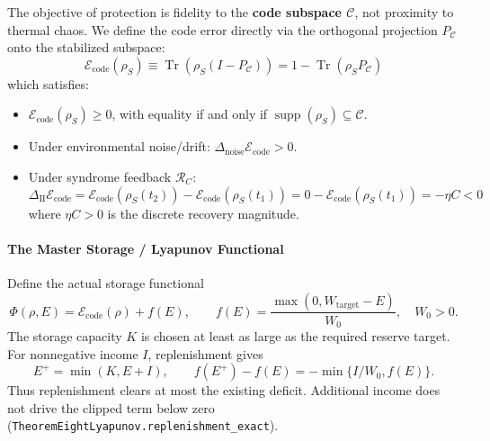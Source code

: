 \documentclass[
]{article}
\providecommand{\tightlist}{%
  \setlength{\itemsep}{0pt}\setlength{\parskip}{0pt}}
\begin{document}
The objective of protection is fidelity to the \textbf{code subspace
\(\mathcal{C}\)}, not proximity to thermal chaos. We define the code
error directly via the orthogonal projection \(P_{\mathcal{C}}\) onto
the stabilized subspace:
\[\mathcal{E}_{\mathrm{code}}(\rho_S) \equiv \operatorname{Tr}\left(\rho_S (I - P_{\mathcal{C}})\right) = 1 - \operatorname{Tr}(\rho_S P_{\mathcal{C}})\]
which satisfies:

\begin{itemize}
\tightlist
\item
  \(\mathcal{E}_{\mathrm{code}}(\rho_S) \ge 0\), with equality if and
  only if \(\operatorname{supp}(\rho_S) \subseteq \mathcal{C}\).
\item
  Under environmental noise/drift:
  \(\Delta_{\mathrm{noise}} \mathcal{E}_{\mathrm{code}} > 0\).
\item
  Under syndrome feedback \(\mathcal{R}_C\):
  \[\Delta_{\mathrm{II}} \mathcal{E}_{\mathrm{code}} = \mathcal{E}_{\mathrm{code}}(\rho_S(t_2)) - \mathcal{E}_{\mathrm{code}}(\rho_S(t_1)) = 0 - \mathcal{E}_{\mathrm{code}}(\rho_S(t_1)) = -\eta C < 0\]
  where \(\eta C > 0\) is the discrete recovery magnitude.
\end{itemize}

\paragraph{The Master Storage / Lyapunov
Functional}\label{the-master-storage-lyapunov-functional}

Define the actual storage functional \[
\Phi(\rho,E)=\mathcal E_{\mathrm{code}}(\rho)+f(E),\qquad
f(E)=\frac{\max(0,W_{\mathrm{target}}-E)}{W_0},\quad W_0>0.
\] The storage capacity \(K\) is chosen at least as large as the
required reserve target. For nonnegative income \(I\), replenishment
gives \[
E^+=\min(K,E+I),\qquad
f(E^+)-f(E)=-\min\{I/W_0,f(E)\}.
\] Thus replenishment clears at most the existing deficit. Additional
income does not drive the clipped term below zero
(\texttt{T\allowbreak{}h\allowbreak{}e\allowbreak{}o\allowbreak{}r\allowbreak{}e\allowbreak{}m\allowbreak{}E\allowbreak{}i\allowbreak{}g\allowbreak{}h\allowbreak{}t\allowbreak{}L\allowbreak{}y\allowbreak{}a\allowbreak{}p\allowbreak{}u\allowbreak{}n\allowbreak{}o\allowbreak{}v\allowbreak{}.\allowbreak{}r\allowbreak{}e\allowbreak{}p\allowbreak{}l\allowbreak{}e\allowbreak{}n\allowbreak{}i\allowbreak{}s\allowbreak{}h\allowbreak{}m\allowbreak{}e\allowbreak{}n\allowbreak{}t\allowbreak{}\_\allowbreak{}e\allowbreak{}x\allowbreak{}a\allowbreak{}c\allowbreak{}t}).
\end{document}

